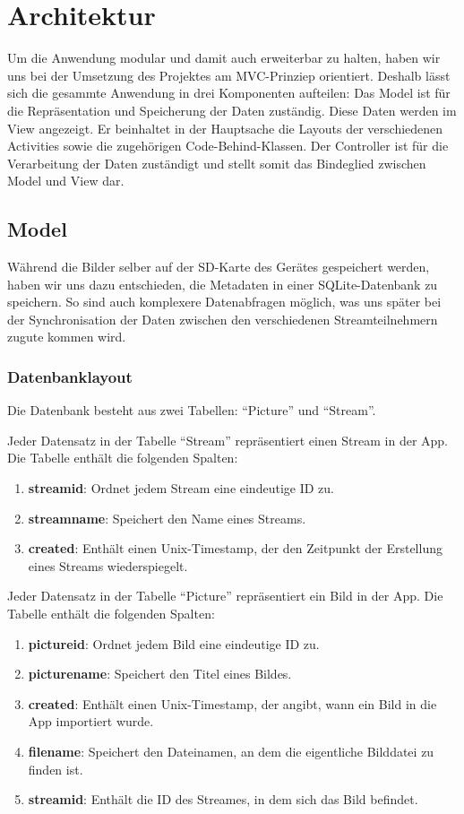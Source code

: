 \chapter{Architektur}

Um die Anwendung modular und damit auch erweiterbar zu halten, haben wir uns bei der Umsetzung des Projektes am MVC-Prinziep orientiert. Deshalb lässt sich die gesammte Anwendung in drei Komponenten aufteilen: Das Model ist für die Repräsentation und Speicherung der Daten zuständig. Diese Daten werden im View angezeigt. Er beinhaltet in der Hauptsache die Layouts der verschiedenen Activities sowie die zugehörigen Code-Behind-Klassen. Der Controller ist für die Verarbeitung der Daten zuständigt und stellt somit das Bindeglied zwischen Model und View dar. 

\section{Model}

Während die Bilder selber auf der SD-Karte des Gerätes gespeichert werden, haben wir uns dazu entschieden, die Metadaten in einer SQLite-Datenbank zu speichern. So sind auch komplexere Datenabfragen möglich, was uns später bei der Synchronisation der Daten zwischen den verschiedenen Streamteilnehmern zugute kommen wird.

\subsection {Datenbanklayout}

Die Datenbank besteht aus zwei Tabellen: \enquote{Picture} und \enquote{Stream}.

Jeder Datensatz in der Tabelle \enquote{Stream} repräsentiert einen Stream in der App. Die Tabelle enthält die folgenden Spalten:
\begin{enumerate}
	\item \textbf{streamid}: Ordnet jedem Stream eine eindeutige ID zu.
	\item \textbf{streamname}: Speichert den Name eines Streams.
	\item \textbf{created}: Enthält einen Unix-Timestamp, der den Zeitpunkt der Erstellung eines Streams wiederspiegelt.
\end{enumerate}

Jeder Datensatz in der Tabelle \enquote{Picture} repräsentiert ein Bild in der App. Die Tabelle enthält die folgenden Spalten:
\begin{enumerate}
	\item \textbf{pictureid}: Ordnet jedem Bild eine eindeutige ID zu.
	\item \textbf{picturename}: Speichert den Titel eines Bildes.
	\item \textbf{created}: Enthält einen Unix-Timestamp, der angibt, wann ein Bild in die App importiert wurde.
	\item \textbf{filename}: Speichert den Dateinamen, an dem die eigentliche Bilddatei zu finden ist.
	\item \textbf{streamid}: Enthält die ID des Streames, in dem sich das Bild befindet.
\end{enumerate}

